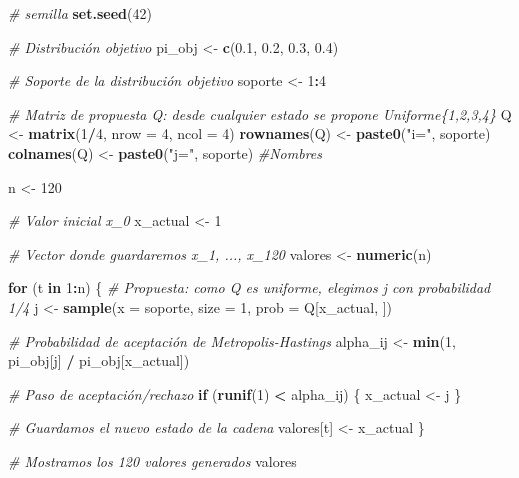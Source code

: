 \documentclass[
]{article}
\newenvironment{Shaded}{\begin{snugshade}}{\end{snugshade}}
\newcommand{\AttributeTok}[1]{\textcolor[rgb]{0.13,0.29,0.53}{#1}}
\newcommand{\CommentTok}[1]{\textcolor[rgb]{0.56,0.35,0.01}{\textit{#1}}}
\newcommand{\ControlFlowTok}[1]{\textcolor[rgb]{0.13,0.29,0.53}{\textbf{#1}}}
\newcommand{\DecValTok}[1]{\textcolor[rgb]{0.00,0.00,0.81}{#1}}
\newcommand{\FloatTok}[1]{\textcolor[rgb]{0.00,0.00,0.81}{#1}}
\newcommand{\FunctionTok}[1]{\textcolor[rgb]{0.13,0.29,0.53}{\textbf{#1}}}
\newcommand{\NormalTok}[1]{#1}
\newcommand{\OtherTok}[1]{\textcolor[rgb]{0.56,0.35,0.01}{#1}}
\newcommand{\SpecialCharTok}[1]{\textcolor[rgb]{0.81,0.36,0.00}{\textbf{#1}}}
\newcommand{\StringTok}[1]{\textcolor[rgb]{0.31,0.60,0.02}{#1}}
\begin{document}
\begin{Shaded}
\begin{Highlighting}[]
\CommentTok{\# semilla }
\FunctionTok{set.seed}\NormalTok{(}\DecValTok{42}\NormalTok{)}

\CommentTok{\# Distribución objetivo}
\NormalTok{pi\_obj }\OtherTok{\textless{}{-}} \FunctionTok{c}\NormalTok{(}\FloatTok{0.1}\NormalTok{, }\FloatTok{0.2}\NormalTok{, }\FloatTok{0.3}\NormalTok{, }\FloatTok{0.4}\NormalTok{)}

\CommentTok{\# Soporte de la distribución objetivo}
\NormalTok{soporte }\OtherTok{\textless{}{-}} \DecValTok{1}\SpecialCharTok{:}\DecValTok{4}

\CommentTok{\# Matriz de propuesta Q: desde cualquier estado se propone Uniforme\{1,2,3,4\}}
\NormalTok{Q }\OtherTok{\textless{}{-}} \FunctionTok{matrix}\NormalTok{(}\DecValTok{1}\SpecialCharTok{/}\DecValTok{4}\NormalTok{, }\AttributeTok{nrow =} \DecValTok{4}\NormalTok{, }\AttributeTok{ncol =} \DecValTok{4}\NormalTok{)}
\FunctionTok{rownames}\NormalTok{(Q) }\OtherTok{\textless{}{-}} \FunctionTok{paste0}\NormalTok{(}\StringTok{"i="}\NormalTok{, soporte)}
\FunctionTok{colnames}\NormalTok{(Q) }\OtherTok{\textless{}{-}} \FunctionTok{paste0}\NormalTok{(}\StringTok{"j="}\NormalTok{, soporte) }\CommentTok{\#Nombres}


\NormalTok{n }\OtherTok{\textless{}{-}} \DecValTok{120}

\CommentTok{\# Valor inicial x\_0}
\NormalTok{x\_actual }\OtherTok{\textless{}{-}} \DecValTok{1}

\CommentTok{\# Vector donde guardaremos x\_1, ..., x\_120}
\NormalTok{valores }\OtherTok{\textless{}{-}} \FunctionTok{numeric}\NormalTok{(n)}

\ControlFlowTok{for}\NormalTok{ (t }\ControlFlowTok{in} \DecValTok{1}\SpecialCharTok{:}\NormalTok{n) \{}
  \CommentTok{\# Propuesta: como Q es uniforme, elegimos j con probabilidad 1/4}
\NormalTok{  j }\OtherTok{\textless{}{-}} \FunctionTok{sample}\NormalTok{(}\AttributeTok{x =}\NormalTok{ soporte, }\AttributeTok{size =} \DecValTok{1}\NormalTok{, }\AttributeTok{prob =}\NormalTok{ Q[x\_actual, ])}
  
  \CommentTok{\# Probabilidad de aceptación de Metropolis{-}Hastings}
\NormalTok{  alpha\_ij }\OtherTok{\textless{}{-}} \FunctionTok{min}\NormalTok{(}\DecValTok{1}\NormalTok{, pi\_obj[j] }\SpecialCharTok{/}\NormalTok{ pi\_obj[x\_actual])}
  
  \CommentTok{\# Paso de aceptación/rechazo}
  \ControlFlowTok{if}\NormalTok{ (}\FunctionTok{runif}\NormalTok{(}\DecValTok{1}\NormalTok{) }\SpecialCharTok{\textless{}}\NormalTok{ alpha\_ij) \{}
\NormalTok{    x\_actual }\OtherTok{\textless{}{-}}\NormalTok{ j}
\NormalTok{  \}}
  
  \CommentTok{\# Guardamos el nuevo estado de la cadena}
\NormalTok{  valores[t] }\OtherTok{\textless{}{-}}\NormalTok{ x\_actual}
\NormalTok{\}}

\CommentTok{\# Mostramos los 120 valores generados}
\NormalTok{valores}
\end{Highlighting}
\end{Shaded}
\end{document}

